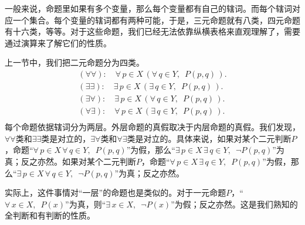 \documentclass[12pt,UTF8,fontset=none]{ctexbook}
\begin{document}
一般来说，命题里如果有多个变量，那么每个变量都有自己的辖词。而每个辖词对应一个集合。每个变量的辖词都有两种可能，于是，三元命题就有八类，四元命题有十六类，等等。对于这些命题，我们已经无法依靠纵横表格来直观理解了，需要通过演算来了解它们的性质。

上一节中，我们把二元命题分为四类。
\begin{align*}
    (\forall\forall):\quad\forall \, p\in X \,( \forall \,q\in Y, \,\,\, P(p,q)\,). \\
    (\exists\exists):\quad\exists \, p\in X \,( \exists \,q\in Y, \,\,\, P(p,q)\,). \\
    (\exists\forall):\quad\exists \, p\in X \,( \forall \,q\in Y, \,\,\, P(p,q)\,). \\
    (\forall\exists):\quad\forall \, p\in X \,( \exists \,q\in Y, \,\,\, P(p,q)\,). \\
\end{align*}
每个命题依据辖词分为两层。外层命题的真假取决于内层命题的真假。我们发现，$\forall\forall$类和$\exists\exists$类是对立的，$\exists\forall$类和$\forall\exists$类是对立的。具体来说，如果对某个二元判断$P$，命题“$\forall \, p\in X \,\forall \,q\in Y, \,\,\, P(p,q)$”为假，那么“$\exists \, p\in X \,\exists \,q\in Y, \,\,\,\neg P(p,q)$”为真；反之亦然。如果对某个二元判断$P$，命题“$\forall \, p\in X \,\exists \,q\in Y, \,\,\, P(p,q)$”为假，那么“$\exists \, p\in X \,\forall \,q\in Y, \,\,\,\neg P(p,q)$”为真；反之亦然。

实际上，这件事情对“一层”的命题也是类似的。对于一元命题$P$，“$\forall \, x\in X, \,\,\, P(x)$”为真，则“$\exists \, x\in X, \,\,\,\neg P(x)$”为假；反之亦然。这是我们熟知的全判断和有判断的性质。
\end{document}

